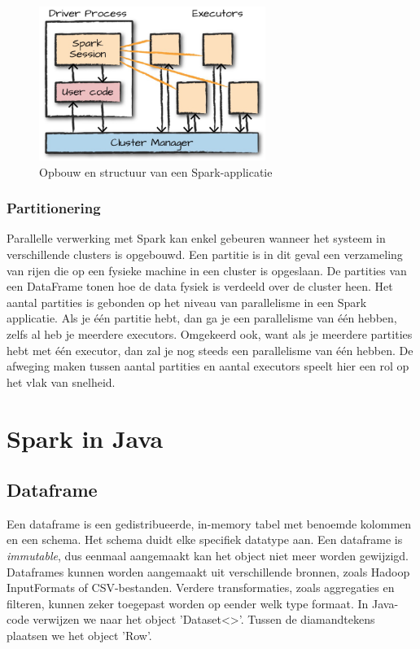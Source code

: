 \documentclass[a4paper,10pt,twoside]{report}
\begin{document}
\begin{figure}
	\begin{center}
		\includegraphics[height=5cm]{images/Screenshot_258.png}
	\end{center}
		\caption{Opbouw en structuur van een Spark-applicatie}
\end{figure}


\subsubsection{Partitionering}

Parallelle verwerking met Spark kan enkel gebeuren wanneer het systeem in verschillende clusters is opgebouwd. Een partitie is in dit geval een verzameling van rijen die op een fysieke machine in een cluster is opgeslaan. De partities van een DataFrame tonen hoe de data fysiek is verdeeld over de cluster heen. Het aantal partities is gebonden op het niveau van parallelisme in een Spark applicatie. Als je één partitie hebt, dan ga je een parallelisme van één hebben, zelfs al heb je meerdere executors. Omgekeerd ook, want als je meerdere partities hebt met één executor, dan zal je nog steeds een parallelisme van één hebben. De afweging maken tussen aantal partities en aantal executors speelt hier een rol op het vlak van snelheid.

\section{Spark in Java}

\subsection{Dataframe}

Een dataframe is een gedistribueerde, in-memory tabel met benoemde kolommen en een schema. Het schema duidt elke specifiek datatype aan. Een dataframe is \textit{immutable}, dus eenmaal aangemaakt kan het object niet meer worden gewijzigd. Dataframes kunnen worden aangemaakt uit verschillende bronnen, zoals Hadoop InputFormats of CSV-bestanden. Verdere transformaties, zoals aggregaties en filteren, kunnen zeker toegepast worden op eender welk type formaat. In Java-code verwijzen we naar het object 'Dataset<>'. Tussen de diamandtekens plaatsen we het object 'Row'.
\end{document}

